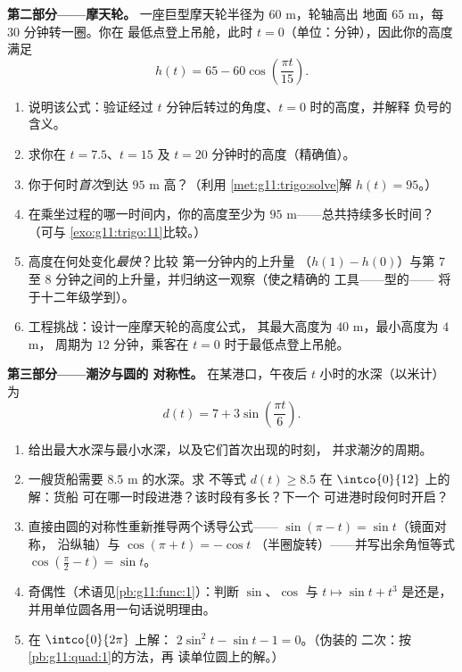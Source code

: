 \begin{problem}
\medskip
\noindent\textbf{第二部分——摩天轮。}
一座巨型摩天轮半径为 $60$ m，轮轴高出
地面 $65$ m，每 $30$ 分钟转一圈。你在
最低点登上吊舱，此时 $t = 0$（单位：分钟），因此你的高度满足
\[
h(t) = 65 - 60 \cos\!\left(\frac{\pi t}{15}\right).
\]
\begin{enumerate}[resume]
  \item 说明该公式：验证经过 $t$
        分钟后转过的角度、$t = 0$ 时的高度，并解释
        负号的含义。
  \item 求你在 $t = 7.5$、$t = 15$ 及
        $t = 20$ 分钟时的高度（精确值）。
  \item 你于何时\emph{首次}到达 $95$ m 高？（利用
        \cref{met:g11:trigo:solve}解 $h(t) = 95$。）
  \item 在乘坐过程的哪一时间内，你的高度至少为
        $95$ m——总共持续多长时间？（可与
        \cref{exo:g11:trigo:11}比较。）
  \item 高度在何处变化\emph{最快}？比较
        第一分钟内的上升量
        （$h(1) - h(0)$）与第 $7$ 至
        $8$ 分钟之间的上升量，并归纳这一观察（使之精确的
        工具——型的——
        将于十二年级学到）。
  \item 工程挑战：设计一座摩天轮的高度公式，
        其最大高度为 $40$ m，最小高度为 $4$ m，
        周期为 $12$ 分钟，乘客在
        $t = 0$ 时于最低点登上吊舱。
\end{enumerate}

\medskip
\noindent\textbf{第三部分——潮汐与圆的
对称性。}
在某港口，午夜后 $t$ 小时的水深（以米计）
为
\[
d(t) = 7 + 3 \sin\!\left(\frac{\pi t}{6}\right).
\]
\begin{enumerate}[resume]
  \item 给出最大水深与最小水深，以及它们首次出现的时刻，
        并求潮汐的周期。
  \item 一艘货船需要 $8.5$ m 的水深。求
        不等式 $d(t) \geq 8.5$ 在 $\intco{0}{12}$ 上的解：货船
        可在哪一时段进港？该时段有多长？下一个
        可进港时段何时开启？
  \item 直接由圆的对称性重新推导两个诱导公式——
        $\sin(\pi - t) = \sin t$（镜面对称，
        沿纵轴）与 $\cos(\pi + t) = -\cos t$
        （半圈旋转）——并写出余角恒等式
        $\cos\left(\frac\pi2 - t\right) = \sin t$。
  \item 奇偶性（术语见\cref{pb:g11:func:1}）：判断
        $\sin$、$\cos$ 与 $t \mapsto \sin t + t^3$ 是还是，
        并用单位圆各用一句话说明理由。
  \item 在 $\intco{0}{2\pi}$ 上解：
        $2\sin^2 t - \sin t - 1 = 0$。（伪装的
        二次：按\cref{pb:g11:quad:1}的方法，再
        读单位圆上的解。）
\end{enumerate}


\end{problem}
